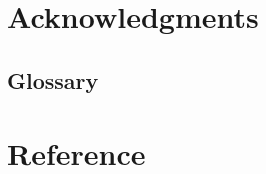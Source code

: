 \documentclass[11pt]{article}
\numberwithin{equation}{section}
\numberwithin{table}{section}
\numberwithin{figure}{section}
\begin{document}
\newpage
\section{Acknowledgments} \label{sec:thanks}






\begin{appendices}

\newpage
\section{Glossary} \label{sec:}


\end{appendices}




\newpage
\section*{Reference} \label{sec:ref}
\end{document}
